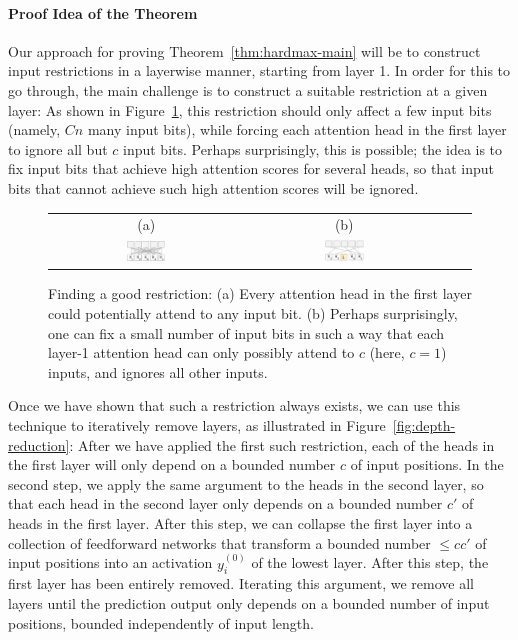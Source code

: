\documentclass[11pt,a4paper]{article}
\begin{document}
\paragraph{Proof Idea of the Theorem}
Our approach for proving Theorem~\ref{thm:hardmax-main} will be to construct input restrictions in a layerwise manner, starting from layer 1. 
In order for this to go through, the main challenge is to construct a suitable restriction at a given layer:
As shown in Figure~\ref{fig:restr}, this restriction should only affect a few input bits (namely, $Cn$ many input bits), while forcing each attention head in the first layer to ignore all but $c$ input bits.
Perhaps surprisingly, this is possible; the idea is to fix input bits that achieve high attention scores for several heads, so that input bits that cannot achieve such high attention scores will be ignored.



\begin{figure}[ht]
    \centering
    \begin{tabular}{cccc}
    (a) & (b) \\
    \includegraphics[width=0.21\textwidth]{writeup/figures/restr-0.png} &
        \includegraphics[width=0.21\textwidth]{writeup/figures/restr-2.png}&
        \end{tabular}
	\caption{Finding a good restriction: (a) Every attention head in the first layer could potentially attend to any input bit. (b) Perhaps surprisingly, one can fix a small number of input bits in such a way that each layer-1 attention head can only possibly attend to $c$ (here, $c=1$) inputs, and ignores all other inputs.}
	\label{fig:restr}
\end{figure}

Once we have shown that such a restriction always exists, we can use this technique to iteratively remove layers, as illustrated in Figure~\ref{fig:depth-reduction}:
After we have applied the first such restriction, each of the heads in the first layer will only depend on a bounded number $c$ of input positions.
In the second step, we apply the same argument to the heads in the second layer, so that each head in the second layer only depends on a bounded number $c'$ of heads in the first layer.
After this step, we can collapse the first layer into a collection of feedforward networks that transform a bounded number $\leq cc'$ of input positions into an activation $y_i^{(0)}$ of the lowest layer.
After this step, the first layer has been entirely removed.
Iterating this argument, we remove all layers until the prediction output only depends on a bounded number of input positions, bounded independently of input length.
\end{document}

